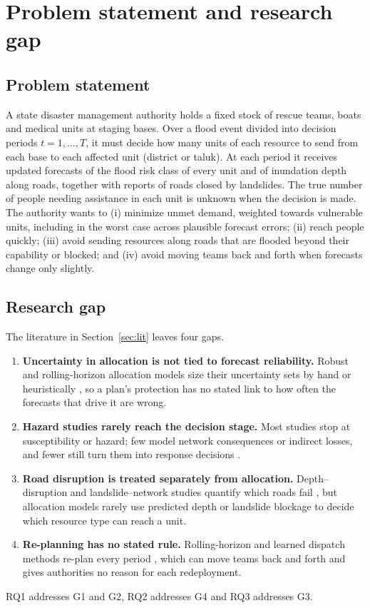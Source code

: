 \documentclass[pdflatex,sn-basic]{sn-jnl}
\theoremstyle{plain}%
\theoremstyle{remark}%
\theoremstyle{definition}%
\begin{document}
\section{Problem statement and research gap}\label{sec:gap}

\subsection{Problem statement}

A state disaster management authority holds a fixed stock of rescue teams, boats and medical units at staging bases. Over a flood event divided into decision periods $t = 1, \dots, T$, it must decide how many units of each resource to send from each base to each affected unit (district or taluk). At each period it receives updated forecasts of the flood risk class of every unit and of inundation depth along roads, together with reports of roads closed by landslides. The true number of people needing assistance in each unit is unknown when the decision is made. The authority wants to (i) minimize unmet demand, weighted towards vulnerable units, including in the worst case across plausible forecast errors; (ii) reach people quickly; (iii) avoid sending resources along roads that are flooded beyond their capability or blocked; and (iv) avoid moving teams back and forth when forecasts change only slightly.

\subsection{Research gap}

The literature in Section~\ref{sec:lit} leaves four gaps.
\begin{enumerate}
\item[G1.] \textbf{Uncertainty in allocation is not tied to forecast reliability.} Robust and rolling-horizon allocation models size their uncertainty sets by hand or heuristically \citep{BenTal2011,Zhang2023,Attar2026}, so a plan's protection has no stated link to how often the forecasts that drive it are wrong.
\item[G2.] \textbf{Hazard studies rarely reach the decision stage.} Most studies stop at susceptibility or hazard; few model network consequences or indirect losses, and fewer still turn them into response decisions \citep{Vega2026}.
\item[G3.] \textbf{Road disruption is treated separately from allocation.} Depth--disruption and landslide--network studies quantify which roads fail \citep{Pregnolato2017,Postance2017,He2026}, but allocation models rarely use predicted depth or landslide blockage to decide which resource type can reach a unit.
\item[G4.] \textbf{Re-planning has no stated rule.} Rolling-horizon and learned dispatch methods re-plan every period \citep{Attar2026,Yan2020,Liu2026}, which can move teams back and forth and gives authorities no reason for each redeployment.
\end{enumerate}
RQ1 addresses G1 and G2, RQ2 addresses G4 and RQ3 addresses G3.
\end{document}

